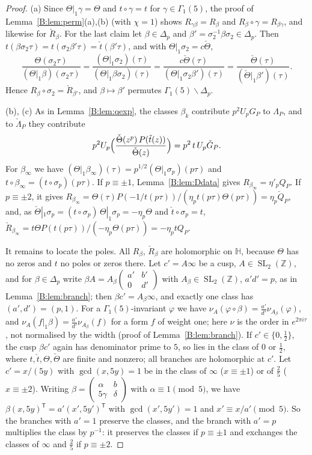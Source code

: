 \documentclass[11pt,a4paper]{article}
\theoremstyle{definition}\newtheorem{definition}[theorem]{Definition}
\theoremstyle{remark}\newtheorem{remark}[theorem]{Remark}
\newcommand{\Z}{\mathbb Z}
\newcommand{\Hb}{\mathbb H}
\DeclareMathOperator{\SL}{SL}
\newcommand{\bmat}[4]{\left(\begin{smallmatrix}#1&#2\\#3&#4\end{smallmatrix}\right)}
\numberwithin{equation}{section}
\begin{document}
\begin{proof}
(a) Since $\Theta|_1\gamma=\Theta$ and $t\circ\gamma=t$ for $\gamma\in\Gamma_1(5)$, the proof of
Lemma~\ref{B:lem:perm}(a),(b) (with $\chi=1$) shows $R_{\gamma\beta}=R_\beta$ and $R_\beta\circ\gamma=R_{\beta\gamma}$, and
likewise for $\check R_\beta$. For the last claim let $\beta\in\Delta_p$ and $\beta'=\sigma_2^{-1}\beta\sigma_2\in\Delta_p$.
Then $t(\beta\sigma_2\tau)=t(\sigma_2\beta'\tau)=\check t(\beta'\tau)$, and with $\Theta|_1\sigma_2=c\check\Theta$,
\[
\frac{\Theta(\sigma_2\tau)}{(\Theta|_1\beta)(\sigma_2\tau)}=\frac{(\Theta|_1\sigma_2)(\tau)}{(\Theta|_1\beta\sigma_2)(\tau)}
=\frac{c\check\Theta(\tau)}{(\Theta|_1\sigma_2\beta')(\tau)}=\frac{\check\Theta(\tau)}{(\check\Theta|_1\beta')(\tau)} .
\]
Hence $R_\beta\circ\sigma_2=\check R_{\beta'}$, and $\beta\mapsto\beta'$ permutes $\Gamma_1(5)\backslash\Delta_p$.

(b), (c) As in Lemma~\ref{B:lem:qexp}, the classes $\beta_k$ contribute $p^2U_pG_P$ to $\Lambda_P$, and to
$\check\Lambda_P$ they contribute
\[
p^2U_p\Bigl(\frac{\check\Theta(z^p)\,P(\check t(z))}{\check\Theta(z)}\Bigr)=p^2\,t\,U_p\check G_P .
\]
For
$\beta_\infty$ we have $(\Theta|_1\beta_\infty)(\tau)=p^{1/2}(\Theta|_1\sigma_p)(p\tau)$ and
$t\circ\beta_\infty=(t\circ\sigma_p)(p\tau)$.
If $p\equiv\pm1$, Lemma~\ref{B:lem:Ddata} gives $R_{\beta_\infty}=\eta'_pQ_P$. If $p\equiv\pm2$, it gives
$R_{\beta_\infty}=\Theta(\tau)P(-1/t(p\tau))/(\eta_pt(p\tau)\Theta(p\tau))=\eta_p\check Q_P$, and, as
$\check\Theta|_1\sigma_p=(t\circ\sigma_p)\,\Theta|_1\sigma_p=-\eta_p\Theta$ and $\check t\circ\sigma_p=t$,
$\check R_{\beta_\infty}=t\Theta P(t(p\tau))/(-\eta_p\Theta(p\tau))=-\eta_ptQ_P$.

It remains to locate the poles. All $R_\beta$, $\check R_\beta$ are holomorphic on $\Hb$, because $\Theta$ has no zeros and
$t$ no poles or zeros there. Let $c'=A\infty$ be a cusp, $A\in\SL_2(\Z)$, and for $\beta\in\Delta_p$ write
$\beta A=A_\beta\bmat{a'}{b'}0{d'}$ with $A_\beta\in\SL_2(\Z)$, $a'd'=p$, as in Lemma~\ref{B:lem:branch}; then
$\beta c'=A_\beta\infty$, and exactly one class has $(a',d')=(p,1)$. For a $\Gamma_1(5)$-invariant $\varphi$ we have
$\nu_A(\varphi\circ\beta)=\frac{a'}{d'}\nu_{A_\beta}(\varphi)$, and $\nu_A(f|_1\beta)=\frac{a'}{d'}\nu_{A_\beta}(f)$ for a
form $f$ of weight one; here $\nu$ is the order in $e^{2\pi i\tau}$, not normalised by the width (proof of
Lemma~\ref{B:lem:branch}). If $c'\in\{0,\frac12\}$, the cusp $\beta c'$ again has denominator prime to $5$, so lies in the
class of $0$ or $\frac12$, where $t,\check t,\Theta,\check\Theta$ are finite and nonzero; all branches are holomorphic at $c'$.
Let $c'=x/(5y)$ with $\gcd(x,5y)=1$ be in the class of $\infty$ ($x\equiv\pm1$) or of $\frac25$ ($x\equiv\pm2$). Writing
$\beta=\bmat\alpha b{5\gamma}\delta$ with $\alpha\equiv1\pmod5$, we have $\beta(x,5y)^{\mathsf T}=a'(x',5y')^{\mathsf T}$
with $\gcd(x',5y')=1$ and $x'\equiv x/a'\pmod5$. So the branches with $a'=1$ preserve the classes, and the branch with
$a'=p$ multiplies the class by $p^{-1}$: it preserves the classes if $p\equiv\pm1$ and exchanges the classes of $\infty$
and $\frac25$ if $p\equiv\pm2$.


\end{proof}
\end{document}
